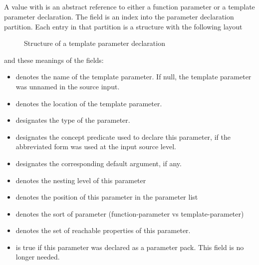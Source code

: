 

\subsection{}
\label{sec:ifc:DeclSort:Parameter}

A  value with   is an abstract reference to 
either a function parameter or a template parameter declaration.
The  field is an index into the parameter declaration partition.  
Each entry in that partition is a structure with the following layout
%
\begin{figure}[H]
	\centering
	\caption{Structure of a template parameter declaration}
	\label{fig:ifc-template-parameter-structure}
\end{figure}
%
and these meanings of the fields:
\begin{itemize}
	\item {} denotes the name of the template parameter.  If null, the template parameter was unnamed in the source input.
	\item {} denotes the location of the template parameter.
	\item {} designates the type of the parameter.
	\item {} designates the concept predicate used to declare this parameter, if the abbreviated form was used at the input source level.
	\item {} designates the corresponding default argument, if any.
	\item {} denotes the nesting level of this parameter
	\item {} denotes the position of this parameter in the parameter list
	\item {} denotes the sort of parameter (function-parameter vs template-parameter)
	\item {} denotes the set of reachable properties of this parameter.
	\item {} is true if this parameter was declared as a parameter pack.  This field is no longer needed.
\end{itemize}

